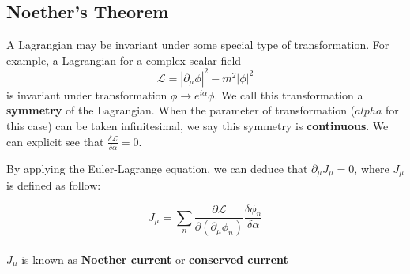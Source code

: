 \documentclass[12pt]{article}
\theoremstyle{mystyle}{\newtheorem{definition}{Definition}[subsection]}
\theoremstyle{mystyle}{\newtheorem{theorem}[definition]{Theorem}}
\theoremstyle{mystyle}{\newtheorem*{remark}{Remark}}
\theoremstyle{mystyle}{\newtheorem{example}{Example}[subsection]}
\theoremstyle{mystyle}{\newtheorem{examples}{Examples}[subsection]}
\theoremstyle{mystyle}{\newtheorem{cthm}{}[subsection]}
\begin{document}
\subsection{Noether's Theorem}
A Lagrangian may be invariant under some special type of transformation.
For example, a Lagrangian for a complex scalar field
\[\mathcal{L}= |\partial_\mu \phi|^2 -m^2|\phi|^2\]
is invariant under transformation \(\phi \rightarrow e^{i\alpha}\phi\).
We call this transformation a \textbf{symmetry} of the Lagrangian.
When the parameter of transformation (\(alpha\) for this case) can be taken infinitesimal,
we say this symmetry is \textbf{continuous}.
We can explicit see that \(\frac{\delta \mathcal{L}}{\delta \alpha}=0\).
\par By applying the Euler-Lagrange equation, we can deduce that \(\partial_\mu J_{\mu}=0\),
where \(J_{\mu}\) is defined as follow:
\begin{definition}
  \[J_{\mu}= \sum_n\frac{\partial \mathcal{L}}{\partial(\partial_\mu \phi_n)}\frac{\delta\phi_n}{\delta \alpha}\]\\
  \(J_{\mu}\) is known as \textbf{Noether current} or \textbf{conserved current}
\end{definition}
\end{document}
